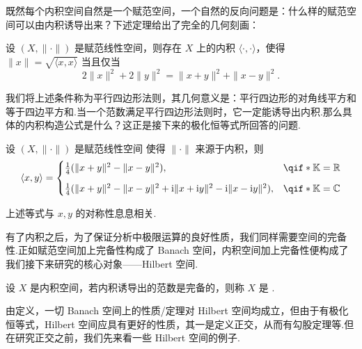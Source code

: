 既然每个内积空间自然是一个赋范空间，一个自然的反向问题是：什么样的赋范空间可以由内积诱导出来？下述定理给出了完全的几何刻画：

\begin{theorem}[平行四边形法则]
    设 $(X, \|\cdot\|)$ 是赋范线性空间，则存在 $X$ 上的内积 $\langle \cdot, \cdot \rangle$，使得 $\|x\| = \sqrt{\langle x, x \rangle}$ 当且仅当
    \[
        2\|x\|^2 + 2\|y\|^2 = \|x + y\|^2 + \|x - y\|^2.
    \]
\end{theorem}

我们将上述条件称为平行四边形法则，其几何意义是：平行四边形的对角线平方和等于四边平方和.当一个范数满足平行四边形法则时，它一定能诱导出内积.那么具体的内积构造公式是什么？这正是接下来的极化恒等式所回答的问题.

\begin{proposition}[极化恒等式]
    设 $(X, \|\cdot\|)$ 是赋范线性空间 使得 $\|\cdot\|$ 来源于内积，则
    \[
        \langle x, y \rangle =
        \begin{cases}
            \frac{1}{4} (\|x + y\|^2 - \|x - y\|^2), & \qif*\mb{K} = \mb{R} \\[7pt]
            \frac{1}{4} (\|x + y\|^2 - \|x - y\|^2 + \iu\|x + \iu y\|^2 - \iu \|x - \iu y\|^2), &\qif* \mb{K} = \mb{C}
        \end{cases}
    \]
\end{proposition}

上述等式与 $x, y$ 的对称性息息相关.

有了内积之后，为了保证分析中极限运算的良好性质，我们同样需要空间的完备性.正如赋范空间加上完备性构成了 Banach 空间，内积空间加上完备性便构成了我们接下来研究的核心对象——Hilbert 空间.

\begin{definition}[Hilbert 空间]
    设 $X$ 是内积空间，若内积诱导出的范数是完备的，则称 $X$ 是 .
\end{definition}

由定义，一切 Banach 空间上的性质/定理对 Hilbert 空间均成立，但由于有极化恒等式，Hilbert 空间应具有更好的性质，其一是定义正交，从而有勾股定理等.但在研究正交之前，我们先来看一些 Hilbert 空间的例子.

